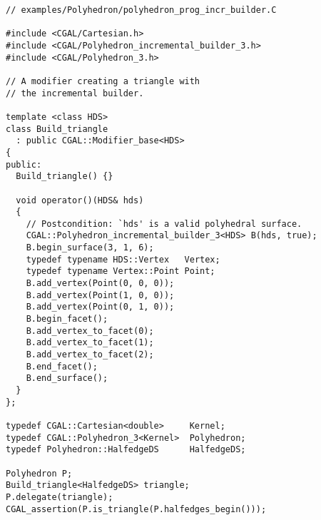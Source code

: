 { \scriptsize
\begin{verbatim}
// examples/Polyhedron/polyhedron_prog_incr_builder.C

#include <CGAL/Cartesian.h>
#include <CGAL/Polyhedron_incremental_builder_3.h>
#include <CGAL/Polyhedron_3.h>

// A modifier creating a triangle with 
// the incremental builder.

template <class HDS>
class Build_triangle
  : public CGAL::Modifier_base<HDS> 
{
public:
  Build_triangle() {}

  void operator()(HDS& hds) 
  {
    // Postcondition: `hds' is a valid polyhedral surface.
    CGAL::Polyhedron_incremental_builder_3<HDS> B(hds, true);
    B.begin_surface(3, 1, 6);
    typedef typename HDS::Vertex   Vertex;
    typedef typename Vertex::Point Point;
    B.add_vertex(Point(0, 0, 0));
    B.add_vertex(Point(1, 0, 0));
    B.add_vertex(Point(0, 1, 0));
    B.begin_facet();
    B.add_vertex_to_facet(0);
    B.add_vertex_to_facet(1);
    B.add_vertex_to_facet(2);
    B.end_facet();
    B.end_surface();
  }
};

typedef CGAL::Cartesian<double>     Kernel;
typedef CGAL::Polyhedron_3<Kernel>  Polyhedron;
typedef Polyhedron::HalfedgeDS      HalfedgeDS;

Polyhedron P;
Build_triangle<HalfedgeDS> triangle;
P.delegate(triangle);
CGAL_assertion(P.is_triangle(P.halfedges_begin()));

\end{verbatim}}
